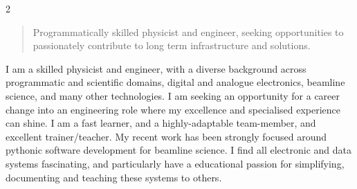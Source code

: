 \documentclass[10pt,a4paper,ragged2e,withhyper]{altacv}
\begin{document}
\begin{paracol}{2}
        
        
        
        \switchcolumn
    

        \vspace{-0.2em}
            \begin{quote}
				Programmatically skilled physicist and engineer, seeking opportunities to passionately contribute to long term infrastructure and solutions.

            \end{quote}
        \vspace{0.5em}
		{\textalignment
		I am a skilled physicist and engineer, with a diverse background across programmatic and scientific domains, digital and analogue electronics, beamline science, and many other technologies. I am seeking an opportunity for a career change into an engineering role where my excellence and specialised experience can shine.
		I am a fast learner, and a highly-adaptable team-member, and excellent trainer/teacher.
		My recent work has been strongly focused around pythonic software development for beamline science. 
		I find all electronic and data systems fascinating, and particularly have a educational passion for simplifying, documenting and teaching these systems to others.
		}
        	

\end{paracol}
\end{document}
